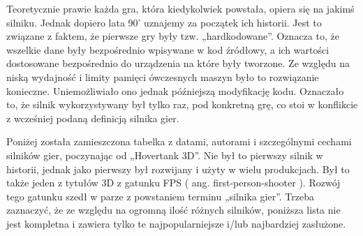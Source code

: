 \documentclass[12pt]{xmgr}
\begin{document}
Teoretycznie prawie każda gra, która kiedykolwiek powstała, opiera się na jakimś silniku. Jednak dopiero lata 90' uznajemy za początek ich historii. Jest to związane z faktem, że pierwsze gry były tzw. „hardkodowane”. Oznacza to, że wszelkie dane były bezpośrednio wpisywane w kod źródłowy, a ich wartości dostosowane bezpośrednio do urządzenia na które były tworzone. Ze względu na niską wydajność i limity pamięci ówczesnych maszyn było to rozwiązanie konieczne. Uniemożliwiało ono jednak późniejszą modyfikację kodu. Oznaczało to, że silnik wykorzystywany był tylko raz, pod konkretną grę, co stoi w konflikcie z wcześniej podaną definicją silnika gier.

Poniżej została zamieszczona tabelka z datami, autorami i szczególnymi cechami silników gier, poczynając od „Hovertank 3D”. Nie był to pierwszy silnik w historii, jednak jako pierwszy był rozwijany i użyty w wielu produkcjach. Był to także jeden z tytułów 3D z gatunku FPS ( ang. first-person-shooter ). Rozwój tego gatunku szedł w parze z powstaniem terminu „silnika gier”. Trzeba zaznaczyć, że ze względu na ogromną ilość różnych silników, poniższa lista nie jest kompletna i zawiera tylko te najpopularniejsze i/lub najbardziej zasłużone.
\end{document}
